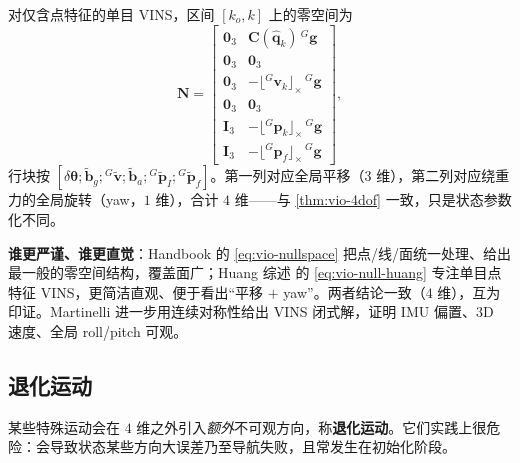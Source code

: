 \begin{theorem}\label{thm:vio-null-huang}
对仅含点特征的单目 VINS，区间 $[k_o,k]$ 上的零空间为\cite{huang2019vins}
\begin{equation}
  \mathbf{N}=\begin{bmatrix}
  \mathbf{0}_3 & \mathbf{C}(\hat{\mathbf{q}}_k)\,{}^G\mathbf{g}\\
  \mathbf{0}_3 & \mathbf{0}_3\\
  \mathbf{0}_3 & -\lfloor{}^G\mathbf{v}_k\rfloor_\times\,{}^G\mathbf{g}\\
  \mathbf{0}_3 & \mathbf{0}_3\\
  \mathbf{I}_3 & -\lfloor{}^G\mathbf{p}_k\rfloor_\times\,{}^G\mathbf{g}\\
  \mathbf{I}_3 & -\lfloor{}^G\mathbf{p}_f\rfloor_\times\,{}^G\mathbf{g}
  \end{bmatrix},
  \label{eq:vio-null-huang}
\end{equation}
行块按 $[\delta\boldsymbol{\theta};\tilde{\mathbf{b}}_g;{}^G\tilde{\mathbf{v}};\tilde{\mathbf{b}}_a;{}^G\tilde{\mathbf{p}}_I;{}^G\tilde{\mathbf{p}}_f]$。第一列对应全局平移（$3$ 维），第二列对应绕重力的全局旋转（yaw，$1$ 维），合计 $4$ 维——与 \cref{thm:vio-4dof} 一致，只是状态参数化不同。
\end{theorem}

\begin{note}
\textbf{谁更严谨、谁更直觉}：Handbook\cite{carlone2026handbook} 的 \cref{eq:vio-nullspace} 把点/线/面统一处理、给出最一般的零空间结构，覆盖面广；Huang 综述\cite{huang2019vins} 的 \cref{eq:vio-null-huang} 专注单目点特征 VINS，更简洁直观、便于看出“平移 $+$ yaw”。两者结论一致（$4$ 维），互为印证。Martinelli\cite{martinelli2014closed} 进一步用连续对称性给出 VINS 闭式解，证明 IMU 偏置、$3$D 速度、全局 roll/pitch 可观。
\end{note}

\subsection{退化运动}
\label{sec:vio-degenerate}

某些特殊运动会在 $4$ 维之外引入\emph{额外}不可观方向，称\textbf{退化运动}\cite{carlone2026handbook,huang2019vins}。它们实践上很危险：会导致状态某些方向大误差乃至导航失败，且常发生在初始化阶段。

